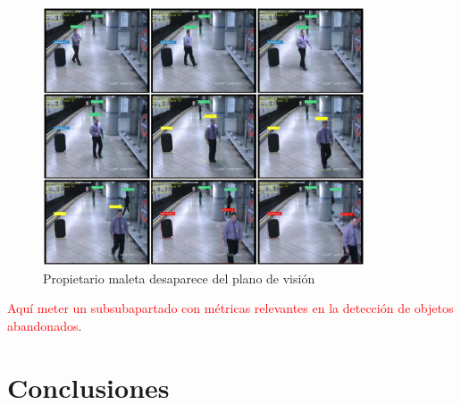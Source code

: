 \begin{figure}[ht]
\centering
\includegraphics[width=0.85\textwidth]{img/chapters/resultados/abandono/abandoned-avssab2007-example2.png}
\caption{\label{fig:propietario-desaparece-plano}Propietario maleta desaparece del plano de visión}
\end{figure}

\textcolor{red}{Aquí meter un subsubapartado con métricas relevantes en la detección de objetos abandonados}.

\newpage

\section{Conclusiones}
\label{sec:conclu-resultados}

